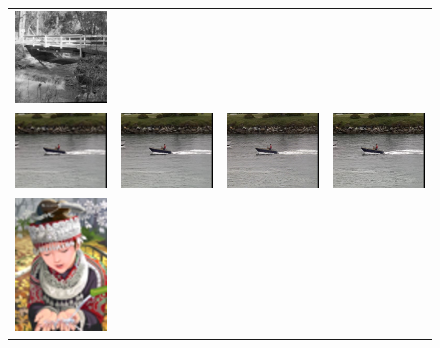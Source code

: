 \documentclass[10pt,twocolumn,letterpaper]{article}
\begin{document}
\begin{figure}[h!]
\begin{tabular}{cccc}
     	\includegraphics[width=1.5in]{images/used/appendix/jpg/Set14/bridge_HR} \\
     	\includegraphics[width=1.5in]{images/used/appendix/jpg/Set14/coastguard_bicubic}&
     	\includegraphics[width=1.5in]{images/used/appendix/jpg/Set14/coastguard_SRResNet-MSE} &
     	\includegraphics[width=1.5in]{images/used/appendix/jpg/Set14/coastguard_SRGAN-VGG54} &
     	\includegraphics[width=1.5in]{images/used/appendix/jpg/Set14/coastguard_HR} \\
     	\includegraphics[width=1.5in]{images/used/appendix/jpg/Set14/comic_bicubic}&

\end{tabular}
\end{figure}
\end{document}
